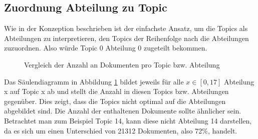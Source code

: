 \documentclass[german,version-2020-11]{uzl-thesis}
\begin{document}
\subsection{Zuordnung Abteilung zu Topic}
Wie in der Konzeption beschrieben ist der einfachste Ansatz, um die Topics als Abteilungen zu interpretieren, den Topics der Reihenfolge nach die Abteilungen zuzuordnen. Also würde Topic 0 Abteilung 0 zugeteilt bekommen. \\
\begin{figure}[H]
\begin{center}
\caption{Vergleich der Anzahl an Dokumenten pro Topic bzw. Abteilung}
\label{fig:countchart}
\end{center}
\end{figure}

Das Säulendiagramm in Abbildung \ref{fig:countchart} bildet jeweils für alle $x \in [0,17]$ Abteilung x auf Topic x ab und stellt die Anzahl in diesen Topics bzw. Abteilungen gegenüber. Dies zeigt, dass die Topics nicht optimal auf die Abteilungen abgebildet sind. Die Anzahl der enthaltenen Dokumente sollte ähnlicher sein. Betrachtet man zum Beispiel Topic 14, kann diese nicht Abteilung 14 darstellen, da es sich um einen Unterschied von 21312 Dokumenten, also 72$\%$, handelt.\\
\end{document}
